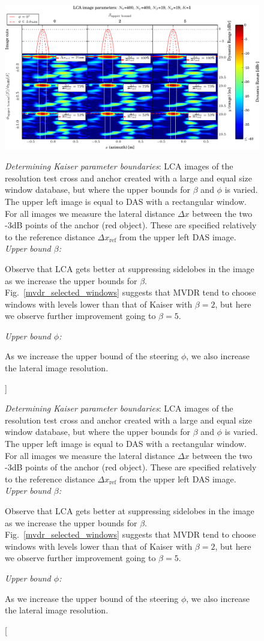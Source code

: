 \documentclass[10pt,journal,draftclsnofoot,onecolumn]{IEEEtran}
\let\MYoriglatexcaption\caption               %
\renewcommand{\caption}[2][\relax]{\MYoriglatexcaption[#2]{#2}}
\newcommand\Fig[1]{Fig.~\ref{#1}}
\newcommand\1{\vec 1}
\begin{document}
\begin{figure}[t]%
\includegraphics[width=\textwidth]{gfx/oversampling_mosaic_bounds.pdf}%
\caption{\emph{Determining Kaiser parameter boundaries}: LCA images of the resolution test cross and anchor created with a large and equal size window database, but where the upper bounds for $\beta$ and $\phi$ is varied. The upper left image is equal to DAS with a rectangular window. For all images we measure the lateral distance $\Delta x$ between the two -3dB points of the anchor (red object). These are specified relatively to the reference distance  $\Delta x_\text{ref}$ from the upper left DAS image.
\newline
\emph{Upper bound $\beta$:}\hfill
\parbox[t]{.89\linewidth}{Observe that LCA gets better at suppressing sidelobes in the image as we increase the upper bounds for $\beta$. \Fig{mvdr_selected_windows} suggests that MVDR tend to choose windows with levels lower than that of Kaiser with $\beta=2$, but here we observe further improvement going to $\beta=5$.}\newline
\emph{Upper bound $\phi$:}\hfill
\parbox[t]{.89\linewidth}{As we increase the upper bound of the steering $\phi$, we also increase the lateral image resolution. }
}\label{oversampling_mosaic_bounds}
\end{figure}

\end{document}
